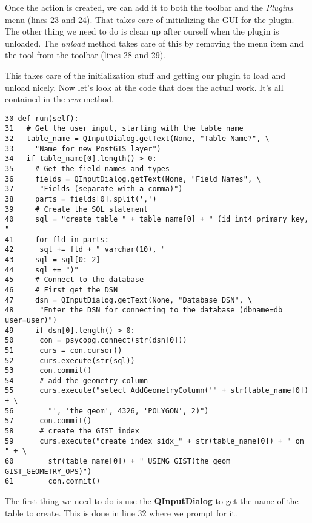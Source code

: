 Once the action is created, we can add it to both the toolbar and the
\textsl{Plugins} menu (lines 23 and 24).
That takes care of initializing the GUI for the plugin. The other thing we 
need to do is clean up after ourself when the plugin is unloaded. The 
\textsl{unload} method takes care of this by removing
the menu item and the tool from the toolbar (lines 28 and 29).

This takes care of the initialization stuff and getting our plugin to load
and unload nicely. Now let's look at the code that does the actual work.
It's all contained in the \textsl{run} method.

\begin{verbatim}
30 def run(self): 
31   # Get the user input, starting with the table name
32   table_name = QInputDialog.getText(None, "Table Name?", \
33     "Name for new PostGIS layer")
34   if table_name[0].length() > 0:
35     # Get the field names and types
36     fields = QInputDialog.getText(None, "Field Names", \
37      "Fields (separate with a comma)")
38     parts = fields[0].split(',')
39     # Create the SQL statement
40     sql = "create table " + table_name[0] + " (id int4 primary key, "
41     for fld in parts:
42      sql += fld + " varchar(10), "
43     sql = sql[0:-2]
44     sql += ")"
45     # Connect to the database
46     # First get the DSN
47     dsn = QInputDialog.getText(None, "Database DSN", \
48      "Enter the DSN for connecting to the database (dbname=db user=user)")
49     if dsn[0].length() > 0:
50      con = psycopg.connect(str(dsn[0]))
51      curs = con.cursor()
52      curs.execute(str(sql))
53      con.commit()
54      # add the geometry column
55      curs.execute("select AddGeometryColumn('" + str(table_name[0]) + \
56        "', 'the_geom', 4326, 'POLYGON', 2)")
57      con.commit()
58      # create the GIST index
59      curs.execute("create index sidx_" + str(table_name[0]) + " on " + \
60        str(table_name[0]) + " USING GIST(the_geom GIST_GEOMETRY_OPS)")
61        con.commit()
\end{verbatim}

The first thing we need to do is use the \textbf{QInputDialog} to get the 
name of the table to create. This is done in line 32 where we prompt for it.



